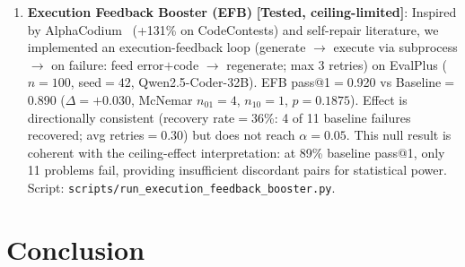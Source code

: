 \documentclass{article}
\begin{document}
\begin{enumerate}[nosep]
  \begin{itemize}[noitemsep,topsep=2pt]
    \item \textbf{Strong model — Qwen2.5-Coder-32B-Instruct} (HF \#1 coding model, 92.7\% HumanEval) on \textbf{EvalPlus} (HumanEval$+$, NeurIPS 2023~\citep{evalplus2023}; $n{=}60$, seed$=42$): Booster pass@1$=$0.817, Baseline$=$0.817 ($\Delta{=}0.000$, McNemar $n_{01}{=}n_{10}{=}2$, $p{=}0.69$).
    \item \textbf{Weak model — GLM-4.5-Air} (${\approx}50\%$ HumanEval) on standard \textbf{HumanEval} (trap-free, $n{=}30$): matched-pair analysis ($n_{\text{pairs}}{=}24$): Baseline$=$0.500, Booster$=$0.375 ($\Delta{=}{-}0.125$, McNemar $n_{01}{=}0$, $n_{10}{=}3$, $p{=}0.25$). The booster never helped on problems the baseline failed, and interfered with 3 previously-solved problems.
  \end{itemize}
  \textbf{H\textsubscript{AB} is rejected at both ends of the ability spectrum}: AI Booster does not improve (and may modestly impair) standard coding. This \emph{confirms} the mechanism is trap-specific --- the VERIFY step targets hallucinated API calls, not general code quality. The large trap-setting effects ($\Delta{=}{+}0.575$ HumanEval-Trap; $\Delta{=}{+}0.235$ MBPP-Easy-Trap) are genuine domain-specific improvements. Scripts: \texttt{scripts/run\_aibooster\_evalplus.py}, \texttt{scripts/run\_aibooster\_standard.py}.
  \item \textbf{Execution Feedback Booster (EFB)} \textbf{[Tested, ceiling-limited]}: Inspired by AlphaCodium~\citep{ridnik2024alphacodium} (+131\% on CodeContests) and self-repair literature, we implemented an execution-feedback loop (generate $\to$ execute via subprocess $\to$ on failure: feed error$+$code $\to$ regenerate; max 3 retries) on EvalPlus ($n{=}100$, seed$=42$, Qwen2.5-Coder-32B). EFB pass@1$=$0.920 vs Baseline$=$0.890 ($\Delta{=}{+}0.030$, McNemar $n_{01}{=}4$, $n_{10}{=}1$, $p{=}0.1875$). Effect is directionally consistent (recovery rate$=$36\%: 4 of 11 baseline failures recovered; avg retries$=$0.30) but does not reach $\alpha{=}0.05$. This null result is coherent with the ceiling-effect interpretation: at 89\% baseline pass@1, only 11 problems fail, providing insufficient discordant pairs for statistical power. Script: \texttt{scripts/run\_execution\_feedback\_booster.py}.
\end{enumerate}

\section{Conclusion}
\end{document}
